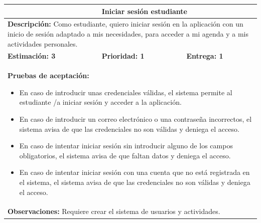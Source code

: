 \begin{table}[H]
\centering
{}
\begin{tabularx}{\textwidth}{|X|X|X|}
\hline
\rowcolor{azulclaro}
\multicolumn{1}{|l|}{\textbf{Identificador:} HU-E1} & \multicolumn{2}{l|}{\textbf{Iniciar sesión estudiante}} \\ \hline
\multicolumn{3}{|p{\dimexpr\textwidth-2\tabcolsep-2\arrayrulewidth}|}{\textbf{Descripción:} Como estudiante, quiero iniciar sesión en la aplicación con un inicio de sesión adaptado a mis necesidades, para acceder a mi agenda y a mis actividades personales.} \\ \hline
\rowcolor{white}
\textbf{Estimación: 3} & \textbf{Prioridad: 1} & \textbf{Entrega: 1} \\ \hline
\multicolumn{3}{|p{\dimexpr\textwidth-2\tabcolsep-2\arrayrulewidth}|}{%
\textbf{Pruebas de aceptación:}
\begin{itemize}[leftmargin=1.5em, itemsep=2pt, topsep=3pt]
    \item En caso de introducir unas credenciales válidas, el sistema permite al estudiante /a iniciar sesión y acceder a la aplicación.
    \item En caso de introducir un correo electrónico o una contraseña incorrectos, el sistema avisa de que las credenciales no son válidas y deniega el acceso.
    \item En caso de intentar iniciar sesión sin introducir alguno de los campos obligatorios, el sistema avisa de que faltan datos y deniega el acceso.
    \item En caso de intentar iniciar sesión con una cuenta que no está registrada en el sistema, el sistema avisa de que las credenciales no son válidas y deniega el acceso.
\end{itemize}
} \\ \hline
\multicolumn{3}{|p{\dimexpr\textwidth-2\tabcolsep-2\arrayrulewidth}|}{\textbf{Observaciones:} Requiere crear el sistema de usuarios y actividades.} \\ \hline
\end{tabularx}
\end{table}

\vspace{0.4cm}


